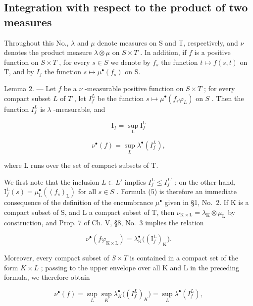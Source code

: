 \subsection{Integration with respect to the product of two measures}

Throughout this No., \(\lambda\) and \(\mu\) denote measures on S and T, respectively, and \(\nu\) denotes the product measure \(\lambda \otimes \mu\) on \(S \times T\) . In addition, if \(f\) is a positive function on \(S \times T\) , for every \(s \in S\) we denote by \(f_s\) the function \(t \mapsto f(s,t)\) on T, and by \(I_f\) the function \(s \mapsto \mu^\bullet(f_s)\) on S.

Lemma 2. --- Let \(f\) be a \(\nu\) -measurable positive function on \(S \times T\) ; for every compact subset \(L\) of \(T\) , let \(I_f^L\) be the function \(s \mapsto \mu^\bullet(f_s \varphi_L)\) on \(S\) . Then the function \(I_f^L\) is \(\lambda\) -measurable, and

\[
\mathrm{I} _ {f} = \sup _ {\mathrm{L}} \mathrm{I} _ {f} ^ {\mathrm{L}}\tag{5}
\]

\[
\nu^ {\bullet} (f) = \sup _ {L} \lambda^ {\bullet} (I _ {f} ^ {L}),\tag{6}
\]

where L runs over the set of compact subsets of T.

We first note that the inclusion \(L \subset L'\) implies \(I_{f}^{L} \leqslant I_{f}^{L'}\) ; on the other hand, \(\mathrm{I}_{f}^{\mathrm{L}}(s) = \mu_{\mathrm{L}}^{\bullet}((f_{s})_{\mathrm{L}})\) for all \(s \in S\) . Formula (5) is therefore an immediate consequence of the definition of the encumbrance \(\mu^{\bullet}\) given in §1, No.~2. If K is a compact subset of S, and L a compact subset of T, then \(\nu_{\mathrm{K} \times \mathrm{L}} = \lambda_{\mathrm{K}} \otimes \mu_{\mathrm{L}}\) by construction, and Prop. 7 of Ch. V, §8, No.~3 implies the relation

\[
\nu^ {\bullet} (f \varphi_ {\mathrm{K} \times \mathrm{L}}) = \lambda_ {\mathrm{K}} ^ {\bullet} \big ((\mathrm{I} _ {f} ^ {\mathrm{L}}) _ {\mathrm{K}} \big).\tag{7}
\]

Moreover, every compact subset of \(S \times T\) is contained in a compact set of the form \(K \times L\) ; passing to the upper envelope over all K and L in the preceding formula, we therefore obtain

\[
\nu^ {\bullet} (f) = \sup _ {L} \sup _ {K} \lambda_ {K} ^ {\bullet} \big ((I _ {f} ^ {L}) _ {K} \big) = \sup _ {L} \lambda^ {\bullet} (I _ {f} ^ {L}),\tag{8}
\]

